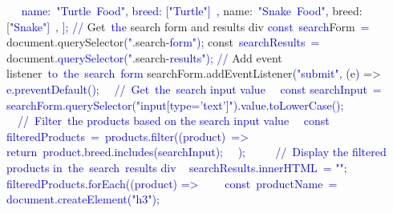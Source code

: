\documentclass{article}
\begin{document}
\begin{tcolorbox}[colframe=black,colback=white]
{}\textcolor{blue}{~}\textcolor{blue}{~{} name:\textcolor{blue}{~"}Turtle\textcolor{blue}{~Food}\textcolor{blue}{",} breed: ["\textcolor{blue}{T}\textcolor{blue}{urtle}"]\textcolor{blue}{~},
}  { name:\textcolor{blue}{~"}\textcolor{blue}{Snake}\textcolor{blue}{~Food}\textcolor{blue}{",} breed: ["\textcolor{blue}{Snake}\textcolor{blue}{"]}\textcolor{blue}{~},
}\textcolor{blue}{];
}\textcolor{blue}{//} Get\textcolor{blue}{~the} search form and results div\textcolor{blue}{
}\textcolor{blue}{const}\textcolor{blue}{~search}Form\textcolor{blue}{~=} document.querySelector\textcolor{blue}{(".}search\textcolor{blue}{-form}\textcolor{blue}{");
}const\textcolor{blue}{~search}\textcolor{blue}{Results}\textcolor{blue}{~=} document\textcolor{blue}{.querySelector}\textcolor{blue}{(".}search\textcolor{blue}{-results}\textcolor{blue}{");
}\textcolor{blue}{//} Add event listener\textcolor{blue}{~to}\textcolor{blue}{~the}\textcolor{blue}{~search}\textcolor{blue}{~form}\textcolor{blue}{
}searchForm.addEventListener\textcolor{blue}{("}\textcolor{blue}{submit}\textcolor{blue}{",} (e\textcolor{blue}{)} =>\textcolor{blue}{~{
}\textcolor{blue}{~} e.preventDefault\textcolor{blue}{();
}  
\textcolor{blue}{~}\textcolor{blue}{~//}\textcolor{blue}{~Get}\textcolor{blue}{~the}\textcolor{blue}{~search} input value\textcolor{blue}{
}\textcolor{blue}{~}\textcolor{blue}{~const} search\textcolor{blue}{Input}\textcolor{blue}{~=} searchForm\textcolor{blue}{.querySelector}\textcolor{blue}{("}input\textcolor{blue}{[type}='\textcolor{blue}{text}']").value\textcolor{blue}{.toLowerCase}\textcolor{blue}{();
}\textcolor{blue}{~~
}\textcolor{blue}{~}\textcolor{blue}{~//}\textcolor{blue}{~Filter}\textcolor{blue}{~the} products based on the search input value
\textcolor{blue}{~}\textcolor{blue}{~const} filtered\textcolor{blue}{Products}\textcolor{blue}{~=}\textcolor{blue}{~products}\textcolor{blue}{.filter}((\textcolor{blue}{product}\textcolor{blue}{)}\textcolor{blue}{~=>}\textcolor{blue}{~{
}\textcolor{blue}{~~~} return\textcolor{blue}{~product}\textcolor{blue}{.b}\textcolor{blue}{reed}.includes\textcolor{blue}{(search}Input);
\textcolor{blue}{~}\textcolor{blue}{~});
}\textcolor{blue}{~~
}\textcolor{blue}{~}\textcolor{blue}{~//}\textcolor{blue}{~Display} the filtered products in\textcolor{blue}{~the}\textcolor{blue}{~search}\textcolor{blue}{~results} div\textcolor{blue}{
}\textcolor{blue}{~} search\textcolor{blue}{Results}\textcolor{blue}{.innerHTML}\textcolor{blue}{~=} "";
  filteredProducts.forEach\textcolor{blue}{((}\textcolor{blue}{product}\textcolor{blue}{)} => {
\textcolor{blue}{~~~}\textcolor{blue}{~const}\textcolor{blue}{~productName}\textcolor{blue}{~=} document.createElement\textcolor{blue}{("}\textcolor{blue}{h}\textcolor{blue}{3}\textcolor{blue}{");
}}}
\end{tcolorbox}
\end{document}
